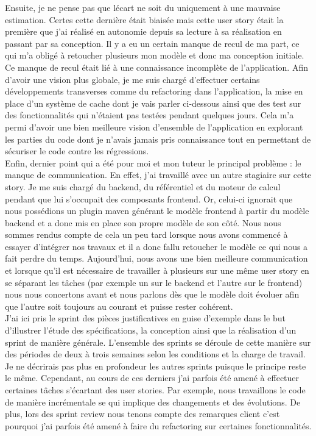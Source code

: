 	Ensuite, je ne pense pas que lécart ne soit du uniquement à une mauvaise estimation. Certes cette dernière était biaisée mais cette user story était la première que j'ai réalisé en autonomie depuis sa lecture à sa réalisation en passant par sa conception. Il y a eu un certain manque de recul de ma part, ce qui m'a obligé à retoucher plusieurs mon modèle et donc ma conception initiale. Ce manque de recul était lié à une connaissance incomplète de l'application. Afin d'avoir une vision plus globale, je me suis chargé d'effectuer certains développements transverses comme du refactoring dans l'application, la mise en place d'un système de cache dont je vais parler ci-dessous ainsi que des test sur des fonctionnalités qui n'étaient pas testées pendant quelques jours. Cela m'a permi d'avoir une bien meilleure vision d'ensemble de l'application en explorant les parties du code dont je n'avais jamais pris connaissance tout en permettant de sécuriser le code contre les régressions. \\
	
	Enfin, dernier point qui a été pour moi et mon tuteur le principal problème : le manque de communication. En effet, j'ai travaillé avec un autre stagiaire sur cette story. Je me suis chargé du backend, du référentiel et du moteur de calcul pendant que lui s'occupait des composants frontend. Or, celui-ci ignorait que nous possédions un plugin maven générant le modèle frontend à partir du modèle backend et a donc mis en place son propre modèle de son côté. Nous nous sommes rendus compte de cela un peu tard lorsque nous avons commencé à essayer d'intégrer nos travaux et il a donc fallu retoucher le modèle ce qui nous a fait perdre du temps. Aujourd'hui, nous avons une bien meilleure communication et lorsque qu'il est nécessaire de travailler à plusieurs sur une même user story en se séparant les tâches (par exemple un sur le backend et l'autre sur le frontend) nous nous concertons avant et nous parlons dès que le modèle doit évoluer afin que l'autre soit toujours au courant et puisse rester cohérent. \\

	J'ai ici pris le sprint des pièces justificatives en guise d'exemple dans le but d'illustrer l'étude des spécifications, la conception ainsi que la réalisation d'un sprint de manière générale. L'ensemble des sprints se déroule de cette manière sur des périodes de deux à trois semaines selon les conditions et la charge de travail. Je ne décrirais pas plus en profondeur les autres sprints puisque le principe reste le même. Cependant, au cours de ces derniers j'ai parfois été amené à effectuer certaines tâches s'écartant des user stories. Par exemple, nous travaillons le code de manière incrémentale se qui implique des changements et des évolutions. De plus, lors des sprint review nous tenons compte des remarques client c'est pourquoi j'ai parfois été amené à faire du refactoring sur certaines fonctionnalités. \\
	
